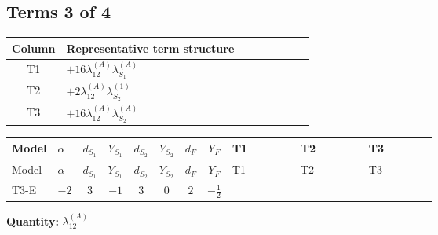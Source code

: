 \documentclass[8pt]{article}
\begin{document}
\begin{landscape}
\subsection*{Terms 3 of 4}
\begin{center}
\begin{tabular}{@{}c >{\raggedright\arraybackslash}p{0.82\linewidth}@{}}
\toprule
Column & Representative term structure \\
\midrule
T1 & \(\displaystyle +16 {\lambda_{12}^{(A)}} {\lambda_{S_1}^{(A)}}\) \\
\midrule
T2 & \(\displaystyle +2 {\lambda_{12}^{(A)}} {\lambda_{S_2}^{(1)}}\) \\
\midrule
T3 & \(\displaystyle +16 {\lambda_{12}^{(A)}} {\lambda_{S_2}^{(A)}}\) \\
\midrule
\bottomrule
\end{tabular}
\end{center}
\smallskip
\tiny
\begin{longtable}{@{}llcccccc >{\raggedright\arraybackslash}p{0.21\linewidth} >{\raggedright\arraybackslash}p{0.21\linewidth} >{\raggedright\arraybackslash}p{0.21\linewidth}@{}}
\toprule
Model & $\alpha$ & $d_{S_1}$ & $Y_{S_1}$ & $d_{S_2}$ & $Y_{S_2}$ & $d_F$ & $Y_F$ & T1 & T2 & T3 \\
\midrule
\endfirsthead
\toprule
Model & $\alpha$ & $d_{S_1}$ & $Y_{S_1}$ & $d_{S_2}$ & $Y_{S_2}$ & $d_F$ & $Y_F$ & T1 & T2 & T3 \\
\midrule
\endhead
T3-E & $-2$ & $3$ & $-1$ & $3$ & $0$ & $2$ & $-\frac{1}{2}$ & \scriptsize\adjustbox{max width=\linewidth}{$\begin{gathered} +16 {\lambda_{12}^{(A)}} {\lambda_{S_1}^{(A)}}\end{gathered}$} & \scriptsize\adjustbox{max width=\linewidth}{$\begin{gathered} +2 {\lambda_{12}^{(A)}} {\lambda_{S_2}^{(1)}}\end{gathered}$} & \scriptsize\adjustbox{max width=\linewidth}{$\begin{gathered} +16 {\lambda_{12}^{(A)}} {\lambda_{S_2}^{(A)}}\end{gathered}$} \\
\midrule
\bottomrule
\end{longtable}
\clearpage
\noindent\textbf{Quantity: }$\lambda_{12}^{(A)}$\par\smallskip

\end{landscape}
\end{document}
